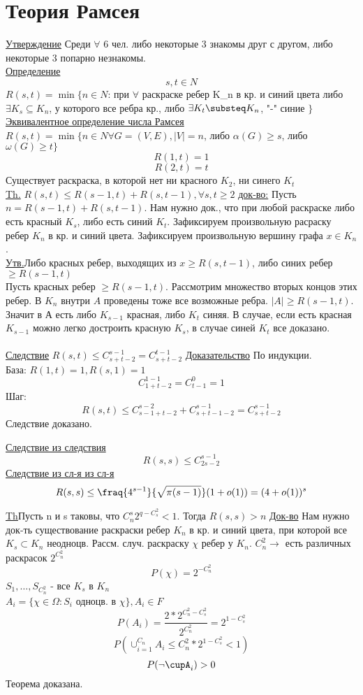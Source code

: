 \documentclass{article}
\begin{document}
 

\section{Теория Рамсея}

\underline{Утверждение}
Среди $\forall$ 6 чел. либо некоторые 3 знакомы друг с другом, либо некоторые 3 попарно незнакомы.\\
\underline{Определение}$$s,t \in N$$
$ R(s,t)=\min\{n \in N $: при $ \forall $ раскраске ребер K_n в кр. и синий цвета либо $\exists K_s \subseteq K_n $, 
у  которого все ребра кр., либо $\exists K_t \substeq K_n $, "-" синие $\}$
\underline{Эквивалентное определение числа Рамсея}
$R(s,t) = \min\{n \in N \forall G=(V,E), |V|=n$, либо $\alpha(G) \ge s$, либо $\omega(G) \ge t\}$\\
$$R(1,t) = 1$$
$$R(2,t) = t$$
Существует раскраска, в которой нет ни красного $K_2$, ни синего $K_t$\\

\underline{Th.} $R(s,t) \le R(s-1,t) + R(s,t-1), \forall s,t \ge 2$
\underline{док-во:}
Пусть $n=R(s-1,t) + R(s,t-1)$. Нам нужно док., что при любой раскраске либо есть красный $K_s$, либо есть синий $K_t$.
Зафиксируем произвольную расраску ребер $K_n$ в кр. и синий цвета.
Зафиксируем произвольную вершину графа $x \in K_n$.\\
\underline{Утв.}Либо красных ребер, выходящих из $x \ge R(s,t-1)$, либо синих ребер $\ge R(s-1,t)$\\
Пусть красных ребер $\ge R(s-1,t)$. Рассмотрим множество вторых концов этих ребер.
В $K_n$ внутри $A$ проведены тоже все возможные ребра. $|A| \ge R(s-1,t)$. 
Значит в А есть либо $K_{s-1}$ красная, либо $K_t$ синяя. 
В случае, если есть красная $K_{s-1}$ можно легко достроить красную $K_s$, в случае синей $K_t$ все доказано.\\
\\

\underline{Следствие}
$R(s,t) \le C_{s+t-2}^{s-1}=C_{s+t-2}^{t-1}$
\underline{Доказательство}
По индукции.\\
База:
$R(1,t)=1, R(s,1) = 1$
$$C_{1+t-2}^{1-1}=C_{t-1}^0=1$$
Шаг:$$R(s,t) \le C_{s-1+t-2}^{s-2} + C_{s+t-1-2}^{s-1}=C_{s+t-2}^{s-1}$$
Следствие доказано.

\underline{Следствие из следствия}
$$R(s,s) \le C_{2s-2}^{s-1}$$
\underline{Следствие из сл-я из сл-я}
$$R(s,s) \le \fraq{4^{s-1}}{\sqrt{\pi(s-1)}}(1 + o(1)) = (4 + o(1))^s$$

\underline{Th}Пусть n  и s таковы, что $C_n^s2^{q-C_s^2}<1$. Тогда $R(s,s) > n$
\underline{Док-во}
Нам нужно док-ть существование раскраски ребер $K_n$ в кр. и синий  цвета, при которой все $K_s \subset K_n$ неодноцв.
Рассм. случ. раскраску $\chi$ ребер у $K_n$. $C_n^2 \to $ есть различных раскрасок $2^{C_n^2}$
$$P(\chi)=2^{-C_n^2}$$
$S_1,\ldots,S_{C_n^2}$ - все $K_s$ в $K_n$\\
$A_i = \{\chi \in \Omega: S_i$ одноцв. в $\chi\}, A_i \in F$
$$P(A_i)=\frac{2*2^{C_n^2-C_s^2}}{2^{C_n^2}}=2^{1-C_s^2}$$
$$P(\cup^{C_n}_{i=1}A_i \le C_n^2*2^{1-C_s^2} < 1)$$
$$P(\neg \cupA_i) > 0$$
Теорема доказана.\\
\\
\end{document}
